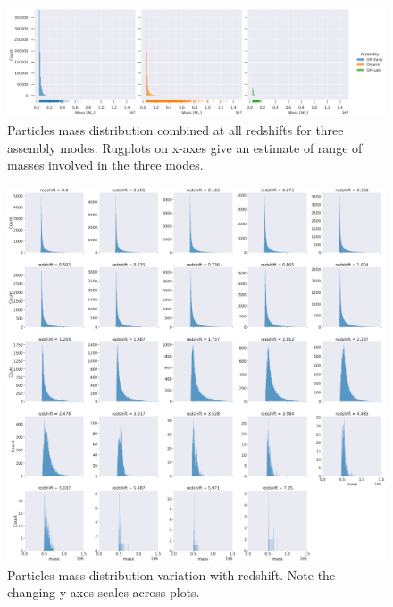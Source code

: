 \documentclass{article}
\begin{document}
	\begin{figure}
			\centering 
			\includegraphics[width=\columnwidth]{../plots/particle_mass_distribution.png}
			\caption{Particles mass distribution combined at all redshifts for three assembly modes. Rugplots on x-axes give an estimate of range of masses involved in the three modes.}
	\end{figure}

	\clearpage

	\begin{figure}
			\centering 
			\includegraphics[width=.9\columnwidth]{../plots/mass_distribution_wrt_redshift_GM-Early.png}
			\caption{Particles mass distribution variation with redshift. Note the changing y-axes scales across plots.}
	\end{figure}
\end{document}
